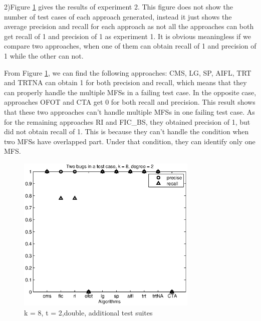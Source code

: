 \documentclass{sig-alternate-05-2015}
\begin{document}
{{%

2)Figure \ref{fig_double} gives the results of experiment 2. This figure does not show the number of test cases of each approach generated, instead it just shows the average precision and recall for each approach as not all the approaches can both get recall of 1 and precision of 1 as experiment 1. It is obvious meaningless if we compare two approaches, when one of them can obtain recall of 1 and precision of 1 while the other can not.

From Figure \ref{fig_double}, we can find the following approaches: CMS, LG, SP, AIFL, TRT and TRTNA can obtain 1 for both precision and recall, which means that they can properly handle the multiple MFSs in a failing test case. In the opposite case, approaches OFOT and CTA get 0 for both recall and precision. This result shows that these two approaches can't handle multiple MFSs in one failing test case. As for the remaining approaches RI and FIC\_BS, they obtained precision of 1, but did not obtain recall of 1. This is because they can't handle the condition when two MFSs have overlapped part. Under that condition, they can identify only one MFS.

%

\begin{figure}
 \centering
 \includegraphics[width=3.4in]{d-8-2.eps}
 \caption{k = 8, t = 2,double, additional test suites}
 \label{fig_double}
\end{figure}

}}
\end{document}
